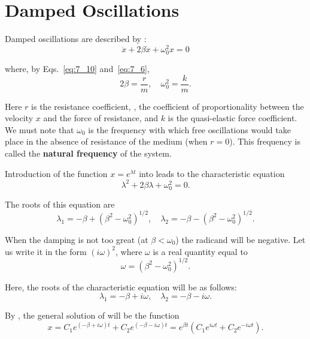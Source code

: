 \section{Damped Oscillations}\label{sec:7_10}

Damped oscillations are described by :
\begin{equation*}
	\ddot{x} + 2\beta\dot{x} + \omega_0^2 x = 0
\end{equation*}

\noindent
where, by Eqs.~\eqref{eq:7_10} and~\eqref{eq:7_6},
\begin{equation*}
	2\beta = \frac{r}{m},\quad \omega_0^2 = \frac{k}{m}.
\end{equation*}

\noindent
Here $r$ is the resistance coefficient, \ie, the coefficient of proportionality between the velocity $x$ and the force of resistance, and $k$ is the quasi-elastic force coefficient. We must note that $\omega_0$ is the frequency with which free oscillations would take place in the absence of resistance of the medium (when $r=0$). This frequency is called the \textbf{natural frequency} of the system.

Introduction of the function $x=e^{\lambda t}$ into  leads to the characteristic equation
\begin{equation}\label{eq:7_98}
	\lambda^2 + 2\beta\lambda + \omega_0^2 = 0.
\end{equation}

\noindent
The roots of this equation are
\begin{equation}\label{eq:7_99}
	\lambda_1 = -\beta + \left(\beta^2 - \omega_0^2\right)^{1/2},\quad \lambda_2 = -\beta - \left(\beta^2 - \omega_0^2\right)^{1/2}.
\end{equation}

When the damping is not too great (at $\beta<\omega_0$) the radicand will be negative. Let us write it in the form $(i\omega)^2$, where $\omega$ is a real quantity equal to
\begin{equation}\label{eq:7_100}
	\omega = \left(\beta^2 - \omega_0^2\right)^{1/2}.
\end{equation}

\noindent
Here, the roots of the characteristic equation will be as follows:
\begin{equation}\label{eq:7_101}
	\lambda_1 = -\beta + i\omega,\quad \lambda_2 = -\beta - i\omega.
\end{equation}

By , the general solution of  will be the function
\begin{equation*}
	x = C_1e^{(-\beta + i\omega)t} + C_2e^{(-\beta - i\omega)t} = e^{\beta t} \left(C_1e^{i\omega t} + C_2e^{-i\omega t}\right).
\end{equation*}

